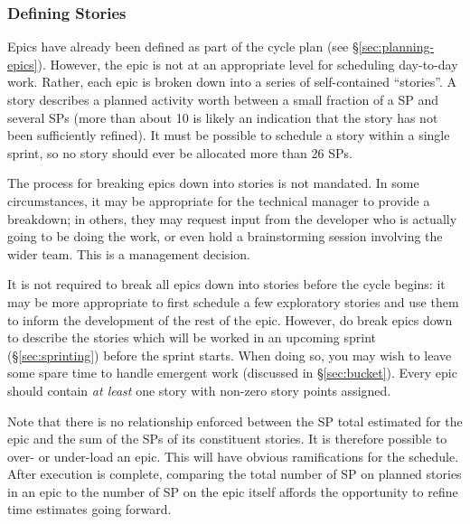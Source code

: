 \begin{itemize}
\subsubsection{Defining Stories}
\label{sec:defining-stories}

Epics have already been defined as part of the \gls{cycle} plan (see \S\ref{sec:planning-epics}).
However, the \gls{epic} is not at an appropriate level for scheduling day-to-day work.
Rather, each \gls{epic} is broken down into a series of self-contained ``stories''.
A \gls{story} describes a planned activity worth between a small fraction of a SP and several \glspl{SP} (more than about 10 is likely an indication that the \gls{story} has not been sufficiently refined).
It must be possible to schedule a \gls{story} within a single sprint, so no \gls{story} should ever be allocated more than 26 \glspl{SP}.

The process for breaking \glspl{epic} down into stories is not mandated. In
some circumstances, it may be appropriate for the technical manager to
provide a breakdown; in others, they may request input from the
developer who is actually going to be doing the work, or even hold a
brainstorming session involving the wider team. This is a management
decision.

It is not required to break all \glspl{epic} down into stories before the \gls{cycle} begins: it may be more appropriate to first schedule a few exploratory stories and use them to inform the development of the rest of the \gls{epic}.
However, do break \glspl{epic} down to describe the stories which will be worked in an upcoming sprint (\S\ref{sec:sprinting}) before the sprint starts.
When doing so, you may wish to leave some spare time to handle emergent work (discussed in \S\ref{sec:bucket}).
Every epic should contain \emph{at least} one story with non-zero story points assigned.

Note that there is no relationship enforced between the \gls{SP} total estimated for the \gls{epic} and the sum of the \glspl{SP} of its constituent stories.
It is therefore possible to over- or under-load an \gls{epic}.
This will have obvious ramifications for the schedule.
After execution is complete, comparing the total number of SP on planned stories in an epic to the number of SP on the epic itself affords the opportunity to refine time estimates going forward.



\end{itemize}
